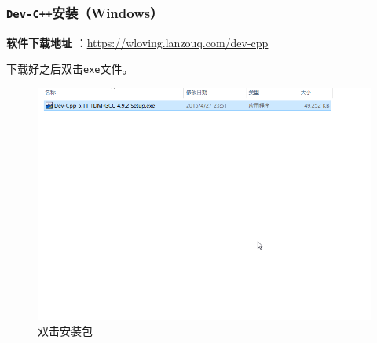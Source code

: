 \subsubsection{\texttt{Dev-C++}安装（Windows）}
\textbf{软件下载地址} ：\href{https://wloving.lanzouq.com/dev-cpp}{https://wloving.lanzouq.com/dev-cpp}

下载好之后双击\texttt{exe}文件。
\begin{figure}[H]
\centering
\includegraphics[width=0.6\linewidth]{01chapter/img/dev安装01}
\caption{双击安装包}
\label{fig:dev01}
\end{figure}

